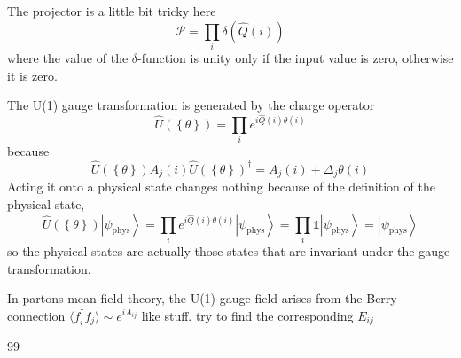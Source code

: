 \documentclass[12font]{article}
\newcommand{\ket}[1]{\left| #1 \right\rangle}
\newcommand{\anglelr}[1]{\langle #1 \rangle}
\newcommand{\lr}[1]{\left(  #1  \right)}
\newcommand{\lrg}[1]{\left\{  #1  \right\}}
\newcommand{\alert}[1]{{\color{red}#1}}
\begin{document}
The projector is a little bit tricky here
\[\mathcal{P} = \prod_{i}\delta\lr{\hat{Q}(i)}\]
where the value of the $\delta$-function is unity only if the input value is zero, otherwise it is zero. 

The U(1) gauge transformation is generated by the charge operator
\[\hat{U}\lr{\lrg{\theta}} = \prod_{i}e^{i\hat{Q}(i)\theta\lr{i}}\]
because
\[\hat{U}\lr{\lrg{\theta}}A_j\lr{i}\hat{U}\lr{\lrg{\theta}}^\dagger = A_j\lr{i} + \Delta_j\theta\lr{i}\]
Acting it onto a physical state changes nothing because of the definition of the physical state,
\[\hat{U}\lr{\lrg{\theta}}\ket{\psi_\text{phys}} = \prod_{i}e^{i\hat{Q}(i)\theta\lr{i}}\ket{\psi_\text{phys}} = \prod_{i}\mathds{1}\ket{\psi_\text{phys}} = \ket{\psi_\text{phys}}\]
so the physical states are actually those states that are invariant under the gauge transformation. 

In partons mean field theory, the U(1) gauge field arises from the Berry connection $\anglelr{f^\dagger_{i}f_j}\sim e^{iA_{ij}}$ like stuff. \alert{try to find the corresponding $E_{ij}$}


\begin{thebibliography}{99}

    \bibitem{}{}

\end{thebibliography}
\end{document}
